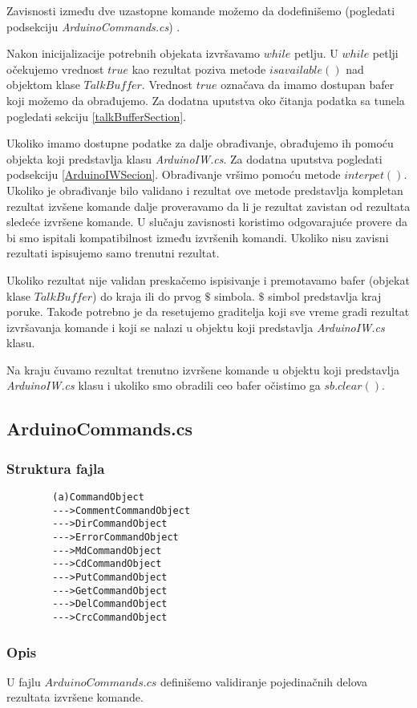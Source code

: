 \documentclass[a4paper]{extarticle}
\begin{document}
	Zavisnosti između dve uzastopne komande možemo da dodefinišemo (pogledati podsekciju  \textit{ArduinoCommands.cs}) .
	
	Nakon inicijalizacije potrebnih  objekata izvršavamo $while$ petlju.
	U $while$ petlji očekujemo vrednost $true$ kao rezultat poziva metode $isavailable()$ nad objektom klase $TalkBuffer$. Vrednost $true$ označava da imamo dostupan bafer koji možemo da obrađujemo. Za dodatna uputstva oko čitanja podatka sa tunela pogledati sekciju \ref{talkBufferSection}.
	
	Ukoliko imamo dostupne podatke  za dalje obrađivanje, obrađujemo ih pomoću objekta koji predstavlja klasu \textit{ArduinoIW.cs}. Za dodatna uputstva pogledati podsekciju \ref{ArduinoIWSecion}. Obrađivanje vršimo pomoću metode $interpet()$. Ukoliko je obrađivanje bilo validano i rezultat ove metode predstavlja kompletan rezultat izvšene komande dalje proveravamo da li je rezultat zavistan od rezultata sledeće izvršene komande. U slučaju zavisnosti koristimo odgovarajuće provere da bi smo ispitali kompatibilnost između izvršenih komandi. Ukoliko nisu zavisni rezultati ispisujemo samo trenutni rezultat.
	
	Ukoliko rezultat nije validan preskačemo ispisivanje i premotavamo bafer (objekat klase $TalkBuffer$) do kraja ili do prvog $\$$ simbola. $\$$ simbol predstavlja kraj poruke. Takođe potrebno je da resetujemo graditelja koji sve vreme gradi rezultat izvršavanja komande i koji se nalazi u objektu koji predstavlja \textit{ArduinoIW.cs} klasu.
	
	Na kraju čuvamo rezultat trenutno izvršene komande u objektu koji predstavlja \textit{ArduinoIW.cs} klasu i ukoliko smo obradili ceo bafer očistimo ga $sb.clear()$.
	
	\subsection{ArduinoCommands.cs}
	\label{a1}
	\subsubsection*{Struktura fajla}
	\begin{verbatim}
		(a)CommandObject
		--->CommentCommandObject
		--->DirCommandObject
		--->ErrorCommandObject
		--->MdCommandObject
		--->CdCommandObject
		--->PutCommandObject
		--->GetCommandObject
		--->DelCommandObject
		--->CrcCommandObject
	\end{verbatim}
	
	\subsubsection*{Opis}
	U fajlu $ArduinoCommands.cs$ definišemo validiranje pojedinačnih delova rezultata izvršene komande.
	
\end{document}
